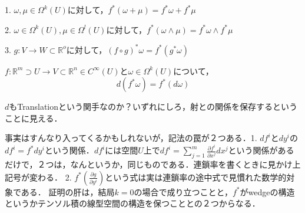 \documentclass[uplatex, dvipdfmx]{jsreport}
\begin{document}
\begin{lemma}
    1. $\omega,\mu\in\Omega^k(U)$に対して，$f^*(\omega+\mu)=f^*\omega+f^*\mu$

    2. $\omega\in\Omega^k(U),\mu\in\Omega^l(U)$に対して，$f^*(\omega\wedge\mu)=f^*\omega\wedge f^*\mu$

    3. $g:V\to W\subset\mathbb{R}^o$に対して，$(f\circ g)^*\omega=f^*(g^*\omega)$
\end{lemma}

\begin{proposition}$f:\mathbb{R}^m\supset U\to V\subset\mathbb{R}^n\in C^\infty(U)$と$\omega\in\Omega^k(U)$について，
    \[ d(f^*\omega)=f^*(d\omega) \]
\end{proposition}
\begin{remark}
    $d$もTranslationという関手なのか？いずれにしろ，射との関係を保存するということに見える．

    事実はすんなり入ってくるかもしれないが，記法の罠が２つある．1. $df^i$と$dy^i$の$df^i=f^*dy^i$という関係．$df^i$には空間$U$上で$df^i=\sum^{m}_{j=1}\frac{\partial f^i}{\partial x^j}dx^j$という関係があるだけで，２つは，なんというか，同じものである．連鎖率を書くときに見かけ上記号が変わる．
    2. $f^*\left(\frac{\partial g}{\partial y^i}\right)$という式は実は連鎖率の途中式で見慣れた数学的対象である．
    証明の肝は，結局$k=0$の場合で成り立つことと，$f^*$がwedgeの構造というかテンソル積の線型空間の構造を保つこととの２つからなる．
\end{remark}
\end{document}
